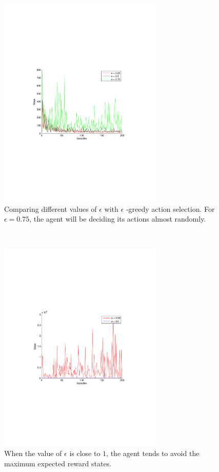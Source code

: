 \documentclass[a4paper,11pt]{article}
\begin{document}
\begin{figure}[t!]
  \centering
    \includegraphics[trim=4cm 8.5cm 4cm 8.5cm,clip,width=0.7\textwidth]{figures/egreedycomp.pdf}
    \caption{Comparing different values of $\epsilon$ with $\epsilon$ -greedy action selection. For $\epsilon = 0.75$, the agent will be deciding its actions almost randomly.}
\end{figure}
~
\begin{figure}[h!]
  \centering
    \includegraphics[trim=4cm 8.5cm 4cm 8.5cm,clip,width=0.7\textwidth]{figures/egreedyextreme.pdf}
    \caption{When the value of $\epsilon$ is close to $1$, the agent tends to avoid the maximum expected reward states.}
\end{figure}
\end{document}
